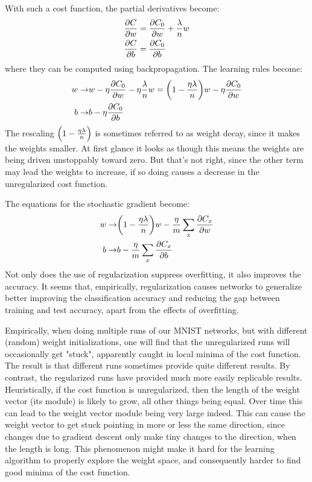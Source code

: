 With such a cost function, the partial derivatives become:
\begin{equation}
\begin{aligned}
\frac{\mathrm{\partial} C}{\mathrm{\partial} w} &=\frac{\mathrm{\partial} C_0}{\mathrm{\partial} w}  + \frac{\lambda}{n} w \\
\frac{\mathrm{\partial} C}{\mathrm{\partial} b} &=\frac{\mathrm{\partial} C_0}{\mathrm{\partial} b}
\end{aligned}
\end{equation}
where they can be computed using backpropagation. The learning rules become:
\begin{equation}
\begin{aligned}
w\rightarrow &w -\eta \frac{\pr C_0}{\pr w} -\eta \frac{\lambda}{n} w = \br{1-\frac{\eta\lambda}{n}}w-\eta \frac{\pr C_0}{\pr w} \\
b\rightarrow &b- \eta \frac{\pr C_0}{\pr b}
\end{aligned}
\end{equation}
The rescaling $\left(1-\frac{\eta\lambda}{n}\right)$ is sometimes referred to as weight decay, since it makes the weights smaller. At first glance it looks as though this means the weights are being driven unstoppably toward zero. But that's not right, since the other term may lead the weights to increase, if so doing causes a decrease in the unregularized cost function.

The equations for the stochastic gradient become:
\begin{equation}
\begin{aligned}
w\rightarrow & \br{1-\frac{\eta\lambda}{n}}w-\frac{\eta}{m} \sum_x\frac{\pr C_x}{\pr w} \\
b\rightarrow &b-\frac{\eta}{m} \sum_x\frac{\pr C_x}{\pr b}
\end{aligned}
\end{equation}
Not only does the use of regularization suppress overfitting, it also improves the accuracy. It seems that, empirically, regularization causes networks to generalize better improving the classification accuracy and reducing the gap between training and test accuracy, apart from the effects of overfitting.

Empirically, when doing multiple runs of our MNIST networks, but with different (random) weight initializations, one will find that the unregularized runs will occasionally get "stuck", apparently caught in local minima of the cost function. The result is that different runs sometimes provide quite different results. By contrast, the regularized runs have provided much more easily replicable results. Heuristically, if the cost function is unregularized, then the length of the weight vector (its module) is likely to grow, all other things being equal. Over time this can lead to the weight vector module being very large indeed. This can cause the weight vector to get stuck pointing in more or less the same direction, since changes due to gradient descent only make tiny changes to the direction, when the length is long. This phenomenon might make it hard for the learning algorithm to properly explore the weight space, and consequently harder to find good minima of the cost function.

